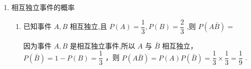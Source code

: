 \begin{enumerate}
\begin{enumerate}
\begin{jieda}
            因为 $P\left( {CD}\right)  = \dfrac{3}{10} \neq  \dfrac{2}{5} \times  \dfrac{3}{5} = P\left( C\right) P\left( D\right)$ ,所以 $C$ 与 $D$ 不相互独立,故 ${C}$ 错误.
            
            因为 $C \cap  D = \{ \left( {1,5}\right) ,\left( {2,4}\right) ,\left( {3,5}\right) \}$ ,所以 $C$ 与 $D$ 不互斥,故 ${D}$ 正确.
        \end{jieda}
        
        \item 假定生男生女是等可能的，设事件A:一个家庭中既有男孩又有女孩； 事件 $B$ : 一个家庭中最多有一个女孩.针对下列两种情形:  家庭中有 2 个小孩；  家庭中有 3 个小孩，下面说法正确是
        \begin{jieda}

            \ps 无论知道不知道$B$，$A$发生的条件概率与无条件概率一致.
        \end{jieda}
    \end{enumerate}
    
    \item 相互独立事件的概率
    \begin{enumerate}
        \item 已知事件 $A,B$ 相互独立,且 $P\left( A\right)  = \dfrac{1}{3},P\left( B\right)  = \dfrac{2}{3}$ ,则 $P\left( {A\bar{B}}\right)  =$ 
        \begin{jieda}
            因为事件 $A,B$ 是相互独立事件,所以 $A$ 与 $\bar{B}$ 相互独立， $P\left( \bar{B}\right)  = 1 - P\left( B\right)  = \dfrac{1}{3}$ ，则 $P\left( {A\bar{B}}\right)  = P\left( A\right) P\left( \bar{B}\right)  = \dfrac{1}{3} \times  \dfrac{1}{3} = \dfrac{1}{9}$ .
        \end{jieda}
        

\end{enumerate}
\end{enumerate}
